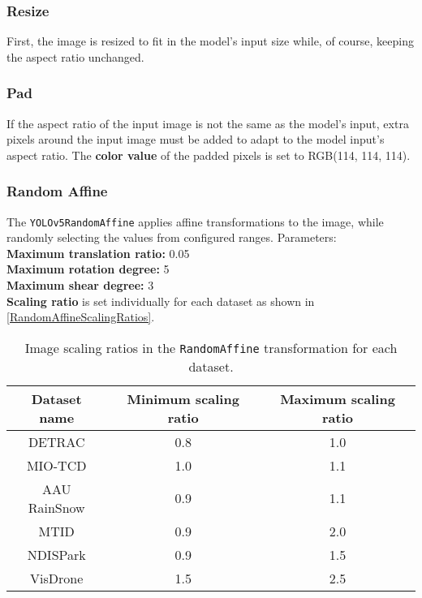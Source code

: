 
\subsubsection*{Resize}

First, the image is resized to fit in the model's input size while, of course,
keeping the aspect ratio unchanged.

\subsubsection*{Pad}

\label{PadTransformation}
If the aspect ratio of the input image is not the same as the model's input, extra pixels around the input image must be added
to adapt to the model input's aspect ratio. The \textbf{color value} of the padded pixels is set to RGB(114, 114, 114).

\subsubsection*{Random Affine}

The \texttt{YOLOv5RandomAffine} applies affine transformations to the image,
while randomly selecting the values from configured ranges. Parameters:\\
\textbf{Maximum translation ratio:} 0.05 \\
\textbf{Maximum rotation degree:} 5 \\
\textbf{Maximum shear degree:} 3 \\
\textbf{Scaling ratio} is set individually for each dataset as shown in \autoref{RandomAffineScalingRatios}.

\begin{table}[h]
\centering
\begin{tabular}{|c|c|c|}
    \hline
    Dataset name & Minimum scaling ratio & Maximum scaling ratio \\
    \hline
    DETRAC       & 0.8 & 1.0 \\
    MIO-TCD      & 1.0 & 1.1 \\
    AAU RainSnow & 0.9 & 1.1 \\
    MTID         & 0.9 & 2.0 \\
    NDISPark     & 0.9 & 1.5 \\
    VisDrone     & 1.5 & 2.5 \\
    \hline
\end{tabular}
\caption{Image scaling ratios in the \texttt{RandomAffine} transformation for each dataset.}
\label{RandomAffineScalingRatios}
\end{table}

